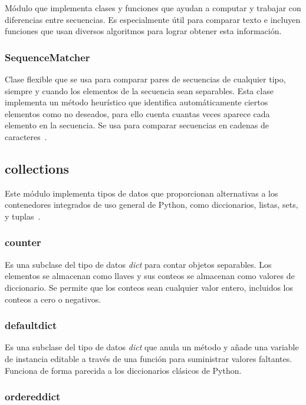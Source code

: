 \documentclass[a4paper, 12pt]{book}
\begin{document}
Módulo que implementa clases y funciones que ayudan a computar y trabajar con diferencias entre secuencias. Es especialmente útil para comparar texto e incluyen funciones que usan diversos algoritmos para lograr obtener esta información.

\subsubsection{SequenceMatcher}
\label{sec:difflib_SequenceMatcher} 

Clase flexible que se usa para comparar pares de secuencias de cualquier tipo, siempre y cuando los elementos de la secuencia sean separables. Esta clase implementa un método heurístico que identifica automáticamente ciertos elementos como no deseados, para ello cuenta cuantas veces aparece cada elemento en la secuencia. Se usa para comparar secuencias en cadenas de caracteres~\cite{sequenceWeb}.

\subsection{collections}
\label{sec:collections}

Este módulo implementa tipos de datos que proporcionan alternativas a los contenedores integrados de uso general de Python, como diccionarios, listas, sets, y tuplas~\cite{collectionWeb}.

\subsubsection{counter}
\label{sec:difflib_counter}

Es una subclase del tipo de datos \textit{dict} para contar objetos separables. Los elementos se almacenan como llaves y sus conteos se almacenan como valores de diccionario. Se permite que los conteos sean cualquier valor entero, incluidos los conteos a cero o negativos.

\subsubsection{defaultdict}
\label{sec:difflib_defaultdict}

Es una subclase del tipo de datos \textit{dict} que anula un método y añade una variable de instancia editable a través de una función para suministrar valores faltantes. Funciona de forma parecida a los diccionarios clásicos de Python.

\subsubsection{ordereddict}
\label{sec:difflib_ordereddict}
\end{document}
